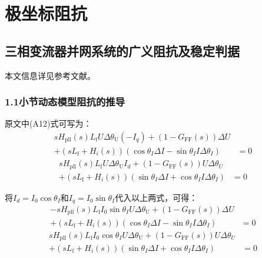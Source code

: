 \documentclass[12pt, a4paper, UTF8, fontset=adobe, scheme=chinese, heading=true, oneside]{ctexbook} %
\begin{document}
\chapter{极坐标阻抗}

\section{三相变流器并网系统的广义阻抗及稳定判据}

本文信息详见参考文献\cite{xin2017}。

\subsection{1.1小节动态模型阻抗的推导}

原文中(A12)式可写为：
\begin{equation}
\begin{split}
  s H_{\mathrm{pll}}(s)L_{\mathrm{f}}U \Delta \theta_{\mathrm{U}}
(-I_q) + (1-G_{\mathrm{FF}}(s))\Delta U & \\ + (sL_{\mathrm{f}}+H_i(s))(\cos\theta_{I}\Delta I - \sin\theta_I I\Delta\theta_I) &= 0 
\end{split}
\end{equation}
\begin{equation}
\begin{split}
  s H_{\mathrm{pll}}(s)L_{\mathrm{f}}U \Delta \theta_{\mathrm{U}}
I_d + (1-G_{\mathrm{FF}}(s))U\Delta \theta_U & \\ + (sL_{\mathrm{f}}+H_i(s))(\sin\theta_{I}\Delta I + \cos\theta_I I\Delta\theta_I) &= 0 
\end{split}
\end{equation}

将$I_d=I_0 \cos\theta_I$和$I_q = I_0 \sin\theta_I$代入以上两式，可得：
\begin{equation}
\begin{split}
  -s H_{\mathrm{pll}}(s)L_{\mathrm{f}}
I_0\sin\theta_I U \Delta \theta_{\mathrm{U}} + (1-G_{\mathrm{FF}}(s))\Delta U & \\ + (sL_{\mathrm{f}}+H_i(s))(\cos\theta_{I}\Delta I - \sin\theta_I I\Delta\theta_I) &= 0 
\end{split}
\end{equation}
\begin{equation}
\begin{split}
  s H_{\mathrm{pll}}(s)L_{\mathrm{f}}I_0\cos\theta_I U \Delta \theta_{\mathrm{U}}
 + (1-G_{\mathrm{FF}}(s))U\Delta \theta_U & \\ + (sL_{\mathrm{f}}+H_i(s))(\sin\theta_{I}\Delta I + \cos\theta_I I\Delta\theta_I) &= 0 \end{split}
\end{equation}
\end{document}
